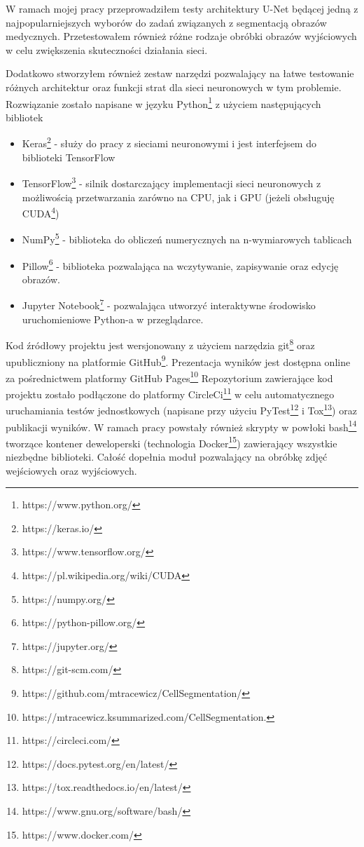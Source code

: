 \documentclass{article}
\begin{document}
W ramach mojej pracy przeprowadziłem testy architektury U-Net będącej jedną z najpopularniejszych wyborów do zadań związanych z segmentacją obrazów medycznych.
Przetestowałem również różne rodzaje obróbki obrazów wyjściowych w celu zwiększenia skuteczności działania sieci.

Dodatkowo stworzyłem również zestaw narzędzi pozwalający na łatwe testowanie różnych architektur oraz funkcji strat dla sieci neuronowych w tym problemie.
Rozwiązanie zostało napisane w języku Python\footnote{https://www.python.org/} z użyciem następujących bibliotek
\begin{itemize}
    \item Keras\footnote{https://keras.io/} - służy do pracy z sieciami neuronowymi i jest interfejsem do biblioteki TensorFlow
    \item TensorFlow\footnote{https://www.tensorflow.org/} - silnik dostarczający implementacji sieci neuronowych \newline z możliwością przetwarzania zarówno na CPU, jak i GPU (jeżeli obsługuję CUDA\footnote{https://pl.wikipedia.org/wiki/CUDA})
    \item NumPy\footnote{https://numpy.org/} - biblioteka do obliczeń numerycznych na n-wymiarowych tablicach
    \item Pillow\footnote{https://python-pillow.org/} - biblioteka pozwalająca na wczytywanie, zapisywanie oraz edycję obrazów.
    \item Jupyter Notebook\footnote{https://jupyter.org/} - pozwalająca utworzyć interaktywne środowisko uruchomieniowe Python-a w przeglądarce.
\end{itemize}
Kod źródłowy projektu jest wersjonowany z użyciem narzędzia git\footnote{https://git-scm.com/} \newline oraz upubliczniony na platformie GitHub\footnote{https://github.com/mtracewicz/CellSegmentation/}.
Prezentacja wyników jest dostępna online za pośrednictwem platformy GitHub Pages\footnote{ https://mtracewicz.ksummarized.com/CellSegmentation.}
Repozytorium zawierające kod projektu zostało podłączone do platformy CircleCi\footnote{https://circleci.com/} w celu automatycznego uruchamiania testów jednostkowych (napisane przy użyciu PyTest\footnote{https://docs.pytest.org/en/latest/} i Tox\footnote{https://tox.readthedocs.io/en/latest/}) oraz publikacji wyników.
W ramach pracy powstały również skrypty w powłoki bash\footnote{https://www.gnu.org/software/bash/} tworzące kontener deweloperski (technologia Docker\footnote{https://www.docker.com/}) zawierający wszystkie niezbędne biblioteki.
Całość dopełnia moduł pozwalający na obróbkę zdjęć wejściowych oraz wyjściowych.
\end{document}

